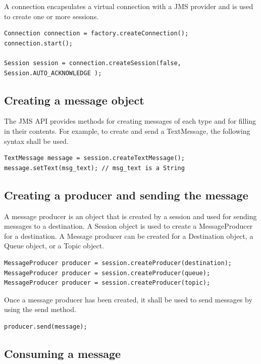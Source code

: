 \documentclass[9pt,twocolumn,twoside]{styles/osajnl}
\begin{document}
A connection encapsulates a virtual connection with a JMS provider
and is used to create one or more sessions.

\begin{lstlisting}
Connection connection = factory.createConnection();
connection.start();

Session session = connection.createSession(false,
Session.AUTO_ACKNOWLEDGE );
\end{lstlisting}

\subsection{Creating a message object}

The JMS API provides methods for creating messages of each type and
for filling in their contents. For example, to create and send a
TextMessage, the following syntax shall be used.

\begin{lstlisting}
TextMessage message = session.createTextMessage();
message.setText(msg_text); // msg_text is a String
\end{lstlisting}

\subsection{Creating a producer and sending the message}

A message producer is an object that is created by a session and used
for sending messages to a destination.  A Session object is used to
create a MessageProducer for a destination. A Message producer can be
created for a Destination object, a Queue object, or a Topic object.

\begin{lstlisting}
MessageProducer producer = session.createProducer(destination);
MessageProducer producer = session.createProducer(queue);
MessageProducer producer = session.createProducer(topic);
\end{lstlisting}

Once a message producer has been created, it shall be used to send
messages by using the send method.

\begin{lstlisting}
producer.send(message);
\end{lstlisting}

\subsection{Consuming a message}
\end{document}
